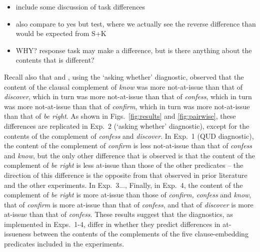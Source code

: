 \documentclass[times,linguex,xcolor]{glossa}
\begin{document}
  \begin{itemize}
    \item include some discussion of task differences
    \item also compare to yes but test, where we actually see the reverse difference than would be expected from S+K
    \item WHY? response task may make a difference, but is there anything about the contents that is different?\bigskip
  \end{itemize}
  
  Recall also that \citealt{tonhauser_how_2018} and \citealt{degen-tonhauser-glossa}, using the `asking whether' diagnostic, observed that the content of the clausal complement of \emph{know} was more not-at-issue than that of \emph{discover}, which in turn was more not-at-issue than that of \emph{confess}, which in turn was more not-at-issue than that of \emph{confirm}, which in turn was more not-at-issue than that of \emph{be right}.  As shown in Figs.~\ref{fig:results} and \ref{fig:pairwise}, these differences are replicated in Exp.~2 (`asking whether' diagnostic), except for the contents of the complement of \emph{confess} and \emph{discover}. In Exp.~1 (QUD diagnostic), the content of the complement of \emph{confirm} is less not-at-issue than that of \emph{confess} and \emph{know}, but the only other difference that is observed is that the content of the complement of \emph{be right} is less at-issue than those of the other predicates -- the direction of this difference is the opposite from that observed in prior literature and the other experiments. In Exp.~3..., Finally, in Exp.~4, the content of the complement of \emph{be right} is more at-issue than those of \emph{confirm, confess} and \emph{know}, that of \emph{confirm} is more at-issue than that of \emph{confess}, and that of \emph{discover} is more at-issue than that of \emph{confess}. These results suggest that the diagnostics, as implemented in Exps.~1-4, differ in whether they predict differences in at-issueness between the contents of the complements of the five clause-embedding predicates included in the experiments.




\end{document}
